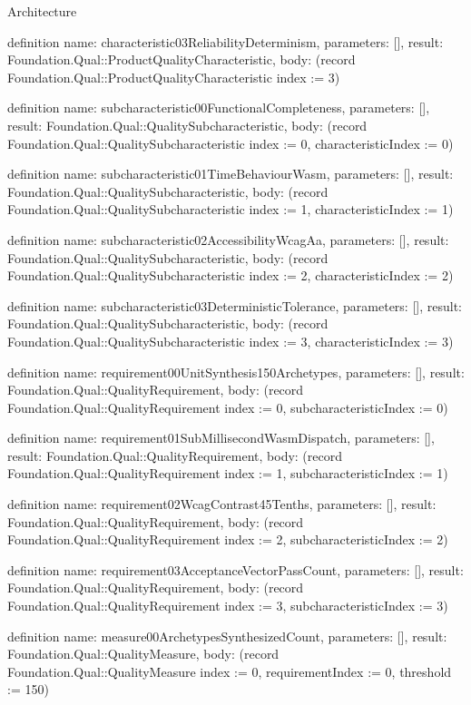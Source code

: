 \begin{lexlean}{Architecture}
\begin{semanticmodule}
definition{
  name: characteristic03ReliabilityDeterminism,
  parameters: [],
  result: Foundation.Qual::ProductQualityCharacteristic,
  body: (record Foundation.Qual::ProductQualityCharacteristic {index := 3})
}

definition{
  name: subcharacteristic00FunctionalCompleteness,
  parameters: [],
  result: Foundation.Qual::QualitySubcharacteristic,
  body: (record Foundation.Qual::QualitySubcharacteristic {index := 0, characteristicIndex := 0})
}

definition{
  name: subcharacteristic01TimeBehaviourWasm,
  parameters: [],
  result: Foundation.Qual::QualitySubcharacteristic,
  body: (record Foundation.Qual::QualitySubcharacteristic {index := 1, characteristicIndex := 1})
}

definition{
  name: subcharacteristic02AccessibilityWcagAa,
  parameters: [],
  result: Foundation.Qual::QualitySubcharacteristic,
  body: (record Foundation.Qual::QualitySubcharacteristic {index := 2, characteristicIndex := 2})
}

definition{
  name: subcharacteristic03DeterministicTolerance,
  parameters: [],
  result: Foundation.Qual::QualitySubcharacteristic,
  body: (record Foundation.Qual::QualitySubcharacteristic {index := 3, characteristicIndex := 3})
}

definition{
  name: requirement00UnitSynthesis150Archetypes,
  parameters: [],
  result: Foundation.Qual::QualityRequirement,
  body: (record Foundation.Qual::QualityRequirement {index := 0, subcharacteristicIndex := 0})
}

definition{
  name: requirement01SubMillisecondWasmDispatch,
  parameters: [],
  result: Foundation.Qual::QualityRequirement,
  body: (record Foundation.Qual::QualityRequirement {index := 1, subcharacteristicIndex := 1})
}

definition{
  name: requirement02WcagContrast45Tenths,
  parameters: [],
  result: Foundation.Qual::QualityRequirement,
  body: (record Foundation.Qual::QualityRequirement {index := 2, subcharacteristicIndex := 2})
}

definition{
  name: requirement03AcceptanceVectorPassCount,
  parameters: [],
  result: Foundation.Qual::QualityRequirement,
  body: (record Foundation.Qual::QualityRequirement {index := 3, subcharacteristicIndex := 3})
}

definition{
  name: measure00ArchetypesSynthesizedCount,
  parameters: [],
  result: Foundation.Qual::QualityMeasure,
  body: (record Foundation.Qual::QualityMeasure {index := 0, requirementIndex := 0, threshold := 150})
}


\end{semanticmodule}
\end{lexlean}

